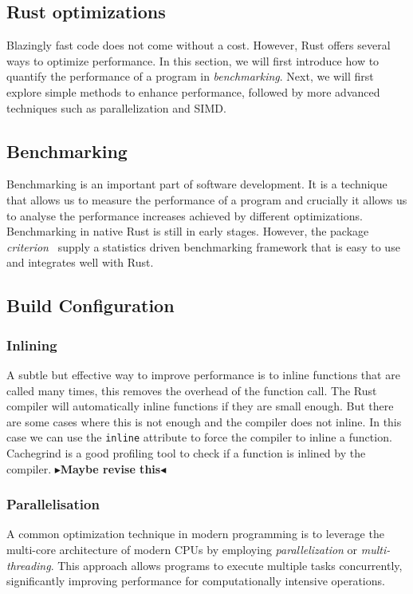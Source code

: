 \documentclass[twoside,11pt]{report}
\theoremstyle{definition}
\theoremstyle{plain}
\newcommand{\todo}[1]{{\color[rgb]{.5,0,0}\textbf{$\blacktriangleright$#1$\blacktriangleleft$}}}
\begin{document}
\subsection{Rust optimizations}\label{sub:rust_optimizations}
Blazingly fast code does not come without a cost. However, Rust offers several ways to optimize performance. In this section, we will first introduce how to quantify the performance of a program in \textit{benchmarking}. Next, we will first explore simple methods to enhance performance, followed by more advanced techniques such as parallelization and SIMD.


\subsection*{Benchmarking}
Benchmarking is an important part of software development. It is a technique that allows us to measure the performance of a program and crucially it allows us to analyse the performance increases achieved by different optimizations. Benchmarking in native Rust is still in early stages. However, the package \textit{criterion}~\cite{criterion} supply a statistics driven benchmarking framework that is easy to use and integrates well with Rust.

\subsection{Build Configuration}


\subsubsection{Inlining}
A subtle but effective way to improve performance is to inline functions that are called many times, this removes the overhead of the function call. The Rust compiler will automatically inline functions if they are small enough. But there are some cases where this is not enough and the compiler does not inline. In this case we can use the \texttt{inline} attribute to force the compiler to inline a function. Cachegrind is a good profiling tool to check if a function is inlined by the compiler.
\todo{Maybe revise this}

\subsubsection{Parallelisation}
A common optimization technique in modern programming is to leverage the multi-core architecture of modern CPUs by employing \textit{parallelization} or \textit{multi-threading}. This approach allows programs to execute multiple tasks concurrently, significantly improving performance for computationally intensive operations.
\end{document}
